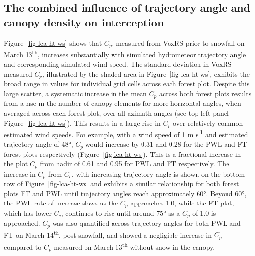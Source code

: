 \documentclass[
  letterpaper,
  DIV=11,
  numbers=noendperiod]{scrartcl}
\begin{document}
\subsection{The combined influence of trajectory angle and canopy
density on
interception}\label{the-combined-influence-of-trajectory-angle-and-canopy-density-on-interception}

Figure~\ref{fig-lca-ht-ws} shows that \(C_p\), measured from VoxRS prior
to snowfall on March 13\textsuperscript{th}, increases substantially
with simulated hydrometeor trajectory angle and corresponding simulated
wind speed. The standard deviation in VoxRS measured \(C_p\),
illustrated by the shaded area in Figure~\ref{fig-lca-ht-ws}, exhibits
the broad range in values for individual grid cells across each forest
plot. Despite this large scatter, a systematic increase in the mean
\(C_p\) across both forest plots results from a rise in the number of
canopy elements for more horizontal angles, when averaged across each
forest plot, over all azimuth angles (see top left panel
Figure~\ref{fig-lca-ht-ws}). This results in a large rise in \(C_p\)
over relatively common estimated wind speeds. For example, with a wind
speed of 1 m s\textsuperscript{-1} and estimated trajectory angle of
48°, \(C_p\) would increase by 0.31 and 0.28 for the PWL and FT forest
plots respectively (Figure~\ref{fig-lca-ht-ws}). This is a fractional
increase in the plot \(C_p\) from nadir of 0.61 and 0.95 for PWL and FT
respectively. The increase in \(C_p\) from \(C_c\), with increasing
trajectory angle is shown on the bottom row of
Figure~\ref{fig-lca-ht-ws} and exhibits a similar relationship for both
forest plots FT and PWL until trajectory angles reach approximately 60°.
Beyond 60°, the PWL rate of increase slows as the \(C_p\) approaches
1.0, while the FT plot, which has lower \(C_c\), continues to rise until
around 75° as a \(C_p\) of 1.0 is approached. \(C_p\) was also
quantified across trajectory angles for both PWL and FT on March
14\textsuperscript{th}, post snowfall, and showed a negligible increase
in \(C_p\) compared to \(C_p\) measured on March 13\textsuperscript{th}
without snow in the canopy.
\end{document}
